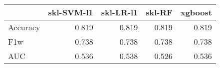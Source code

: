 \begin{tabular}{lrrrr}
\toprule
{} &  skl-SVM-l1 &  skl-LR-l1 &  skl-RF &  xgboost \\
\midrule
Accuracy &       0.819 &      0.819 &   0.819 &    0.819 \\
F1w      &       0.738 &      0.738 &   0.738 &    0.738 \\
AUC      &       0.536 &      0.538 &   0.526 &    0.536 \\
\bottomrule
\end{tabular}
